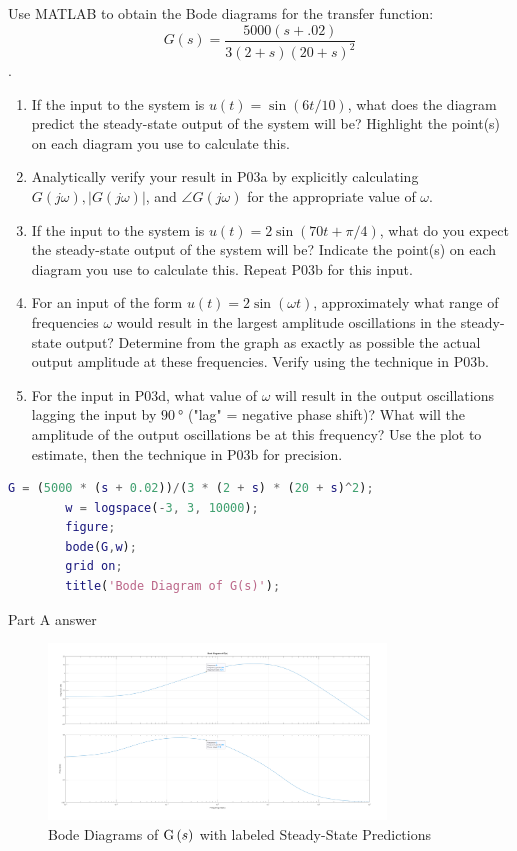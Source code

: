 \begin{hwkProblem}{3}{}

	Use MATLAB to obtain the Bode diagrams for the transfer function: \[ G(s)=\frac{5000(s+.02)}{3(2+s)(20+s)^{2}} \].
	\begin{enumerate}
		\item If the input to the system is \(u(t)=\sin (6 t / 10)\), what does the diagram predict the steady-state output of the system will be? Highlight the point(s) on each diagram you use to calculate this.
		\item Analytically verify your result in P03a by explicitly calculating \(G(j \omega),|G(j \omega)|\), and \(\angle G(j \omega)\) for the appropriate value of \(\omega\).
		\item If the input to the system is \(u(t)=2 \sin (70 t+\pi / 4)\), what do you expect the steady-state output of the system will be? Indicate the point(s) on each diagram you use to calculate this. Repeat P03b for this input.
		\item For an input of the form \(u(t)=2 \sin (\omega t)\), approximately what range of frequencies \(\omega\) would result in the largest amplitude oscillations in the steady-state output? Determine from the graph as exactly as possible the actual output amplitude at these frequencies. Verify using the technique in P03b.
		\item For the input in P03d, what value of \(\omega\) will result in the output oscillations lagging the input by \( \qty{90}{\degree} \) ("lag" = negative phase shift)? What will the amplitude of the output oscillations be at this frequency? Use the plot to estimate, then the technique in P03b for precision.
	\end{enumerate}

	\hwkSol{}

	\begin{lstlisting}[language={matlab}, label={lst:s03}, caption={MATLAB code for HW05 P03}]
		G = (5000 * (s + 0.02))/(3 * (2 + s) * (20 + s)^2);
		w = logspace(-3, 3, 10000);
		figure;
		bode(G,w);
		grid on;
		title('Bode Diagram of G(s)');
	\end{lstlisting}

	\hwkPart{}

	Part A answer

	\begin{figure}[H]
		\begin{center}
			\includegraphics[width=0.8\textwidth]{./images/s03a.png}
		\end{center}
		\caption{Bode Diagrams of \( \func{G}[s] \) with labeled Steady-State Predictions}\label{fig:s03a}
	\end{figure}


\end{hwkProblem}
